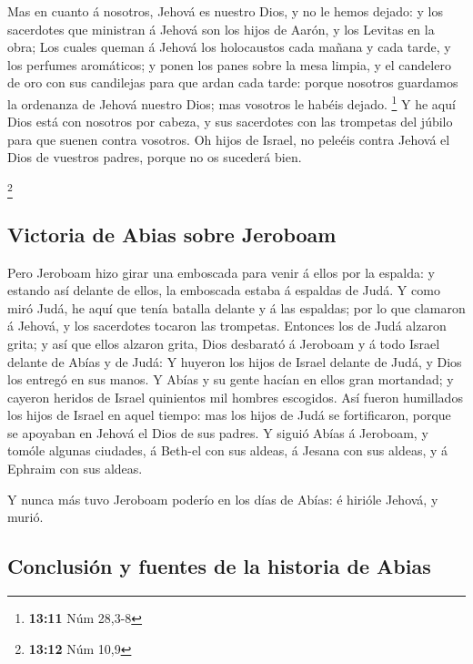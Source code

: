  Mas en cuanto á nosotros, Jehová es nuestro Dios, y no le
hemos dejado: y los sacerdotes que ministran á Jehová son los hijos de
Aarón, y los Levitas en la obra;  Los cuales queman á
Jehová los holocaustos cada mañana y cada tarde, y los perfumes
aromáticos; y ponen los panes sobre la mesa limpia, y el candelero de
oro con sus candilejas para que ardan cada tarde: porque nosotros
guardamos la ordenanza de Jehová nuestro Dios; mas vosotros le habéis
dejado. \footnote{\textbf{13:11} Núm 28,3-8}  Y he aquí
Dios está con nosotros por cabeza, y sus sacerdotes con las trompetas
del júbilo para que suenen contra vosotros. Oh hijos de Israel, no
peleéis contra Jehová el Dios de vuestros padres, porque no os sucederá
bien.

\footnote{\textbf{13:12} Núm 10,9}

\hypertarget{victoria-de-abias-sobre-jeroboam}{%
\subsection{Victoria de Abias sobre
Jeroboam}\label{victoria-de-abias-sobre-jeroboam}}

 Pero Jeroboam hizo girar una emboscada para venir á ellos
por la espalda: y estando así delante de ellos, la emboscada estaba á
espaldas de Judá.  Y como miró Judá, he aquí que tenía
batalla delante y á las espaldas; por lo que clamaron á Jehová, y los
sacerdotes tocaron las trompetas.  Entonces los de Judá
alzaron grita; y así que ellos alzaron grita, Dios desbarató á Jeroboam
y á todo Israel delante de Abías y de Judá:  Y huyeron los
hijos de Israel delante de Judá, y Dios los entregó en sus manos.
 Y Abías y su gente hacían en ellos gran mortandad; y
cayeron heridos de Israel quinientos mil hombres escogidos.
 Así fueron humillados los hijos de Israel en aquel tiempo:
mas los hijos de Judá se fortificaron, porque se apoyaban en Jehová el
Dios de sus padres.  Y siguió Abías á Jeroboam, y tomóle
algunas ciudades, á Beth-el con sus aldeas, á Jesana con sus aldeas, y á
Ephraim con sus aldeas.

 Y nunca más tuvo Jeroboam poderío en los días de Abías: é
hirióle Jehová, y murió.

\hypertarget{conclusiuxf3n-y-fuentes-de-la-historia-de-abias}{%
\subsection{Conclusión y fuentes de la historia de
Abias}\label{conclusiuxf3n-y-fuentes-de-la-historia-de-abias}}

